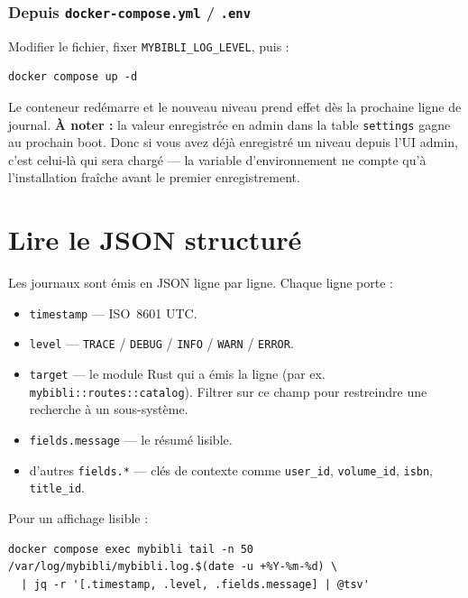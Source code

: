 \subsubsection*{Depuis \texttt{docker-compose.yml} / \texttt{.env}}

Modifier le fichier, fixer \texttt{MYBIBLI\_LOG\_LEVEL}, puis :

\begin{lstlisting}
docker compose up -d
\end{lstlisting}

Le conteneur redémarre et le nouveau niveau prend effet dès la
prochaine ligne de journal. \textbf{À noter :} la valeur enregistrée
en admin dans la table \texttt{settings} gagne au prochain boot.
Donc si vous avez déjà enregistré un niveau depuis l'UI admin, c'est
celui-là qui sera chargé \string— la variable d'environnement ne
compte qu'à l'installation fraîche avant le premier enregistrement.

\section{Lire le JSON structuré}

Les journaux sont émis en JSON ligne par ligne. Chaque ligne porte :

\begin{itemize}
  \item \texttt{timestamp} — ISO~8601 UTC.
  \item \texttt{level} — \texttt{TRACE} / \texttt{DEBUG} /
        \texttt{INFO} / \texttt{WARN} / \texttt{ERROR}.
  \item \texttt{target} — le module Rust qui a émis la ligne
        (par ex. \texttt{mybibli::routes::catalog}). Filtrer sur ce
        champ pour restreindre une recherche à un sous-système.
  \item \texttt{fields.message} — le résumé lisible.
  \item d'autres \texttt{fields.*} — clés de contexte comme
        \texttt{user\_id}, \texttt{volume\_id}, \texttt{isbn},
        \texttt{title\_id}.
\end{itemize}

Pour un affichage lisible :

\begin{lstlisting}
docker compose exec mybibli tail -n 50 /var/log/mybibli/mybibli.log.$(date -u +%Y-%m-%d) \
  | jq -r '[.timestamp, .level, .fields.message] | @tsv'
\end{lstlisting}

